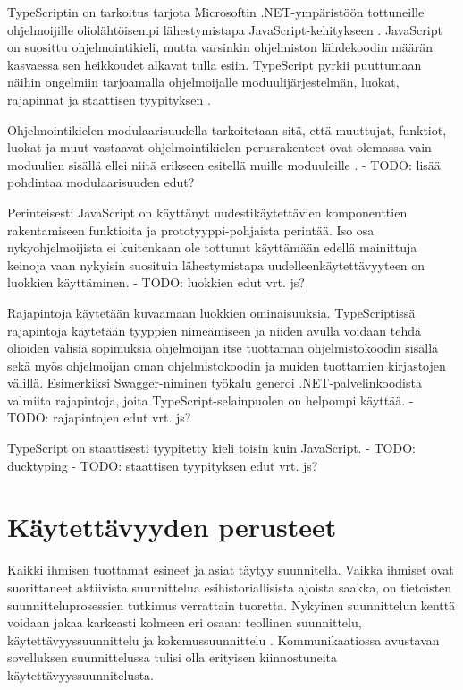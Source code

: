 \documentclass[utf8]{gradu3}
\begin{document}
TypeScriptin on tarkoitus tarjota Microsoftin .NET-ympäristöön tottuneille ohjelmoijille oliolähtöisempi lähestymistapa JavaScript-kehitykseen \parencite[]{maharry-typescript}. JavaScript on suosittu ohjelmointikieli, mutta varsinkin ohjelmiston lähdekoodin määrän kasvaessa sen heikkoudet alkavat tulla esiin. TypeScript pyrkii puuttumaan näihin ongelmiin tarjoamalla ohjelmoijalle moduulijärjestelmän, luokat, rajapinnat ja staattisen tyypityksen \parencite[]{understanding-typescript}.

Ohjelmointikielen modulaarisuudella tarkoitetaan sitä, että muuttujat, funktiot, luokat ja muut vastaavat ohjelmointikielen perusrakenteet ovat olemassa vain moduulien sisällä ellei niitä erikseen esitellä muille moduuleille \parencite[]{typescript-modules}.
- TODO: lisää pohdintaa modulaarisuuden edut?

Perinteisesti JavaScript on käyttänyt uudestikäytettävien komponenttien rakentamiseen funktioita ja prototyyppi-pohjaista perintää. Iso osa nykyohjelmoijista ei kuitenkaan ole tottunut käyttämään edellä mainittuja keinoja vaan nykyisin suosituin lähestymistapa uudelleenkäytettävyyteen on luokkien käyttäminen. \parencite[]{typescript-classes}
- TODO: luokkien edut vrt. js?

Rajapintoja käytetään kuvaamaan luokkien ominaisuuksia. TypeScriptissä rajapintoja käytetään tyyppien nimeämiseen ja niiden avulla voidaan tehdä olioiden välisiä sopimuksia ohjelmoijan itse tuottaman ohjelmistokoodin sisällä sekä myös ohjelmoijan oman ohjelmistokoodin ja muiden tuottamien kirjastojen välillä. \parencite[]{typescript-interfaces} Esimerkiksi Swagger-niminen työkalu generoi .NET-palvelinkoodista valmiita rajapintoja, joita TypeScript-selainpuolen on helpompi käyttää.
- TODO: rajapintojen edut vrt. js?

TypeScript on staattisesti tyypitetty kieli toisin kuin JavaScript.
- TODO: ducktyping
- TODO: staattisen tyypityksen edut vrt. js?

\section{Käytettävyyden perusteet}

Kaikki ihmisen tuottamat esineet ja asiat täytyy suunnitella. Vaikka ihmiset ovat suorittaneet aktiivista suunnittelua esihistoriallisista ajoista saakka, on tietoisten suunnitteluprosessien tutkimus verrattain tuoretta. Nykyinen suunnittelun kenttä voidaan jakaa karkeasti kolmeen eri osaan: teollinen suunnittelu, käytettävyyssuunnittelu ja kokemussuunnittelu \parencite[]{norman-doet}. Kommunikaatiossa avustavan sovelluksen suunnittelussa tulisi olla erityisen kiinnostuneita käytettävyyssuunnitelusta.
\end{document}
